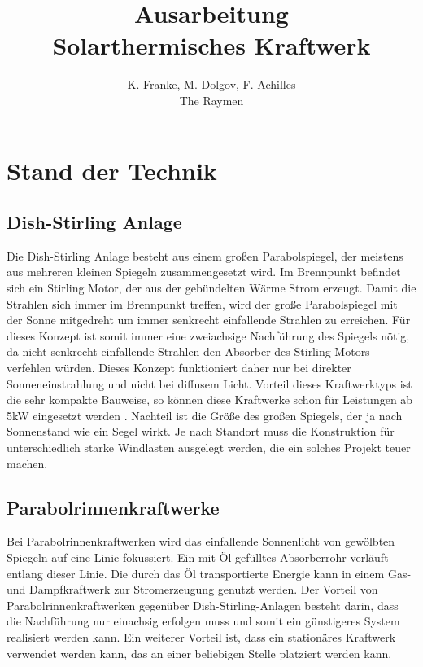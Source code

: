 \documentclass[fontsize=10pt,paper=a4,bibliography=totoc]{scrartcl}
\title{Ausarbeitung\\Solarthermisches Kraftwerk}
\author{K. Franke, M. Dolgov, F. Achilles\\The Raymen}
\begin{document}
\maketitle

\section{Stand der Technik}

\subsection{Dish-Stirling Anlage}
Die Dish-Stirling Anlage besteht aus einem großen Parabolspiegel, der meistens aus mehreren kleinen Spiegeln zusammengesetzt wird. Im Brennpunkt befindet sich ein Stirling Motor, der aus der gebündelten Wärme Strom erzeugt. Damit die Strahlen sich immer im Brennpunkt treffen, wird der große Parabolspiegel mit der Sonne mitgedreht um immer senkrecht einfallende Strahlen zu erreichen. Für dieses Konzept ist somit immer eine zweiachsige Nachführung des Spiegels nötig, da nicht senkrecht einfallende Strahlen den Absorber des Stirling Motors verfehlen würden. Dieses Konzept funktioniert daher nur bei direkter Sonneneinstrahlung und nicht bei diffusem Licht. Vorteil dieses Kraftwerktyps ist die sehr kompakte Bauweise, so können diese Kraftwerke schon für Leistungen ab 5kW eingesetzt werden \cite{1}. Nachteil ist die Größe des großen Spiegels, der ja nach Sonnenstand wie ein Segel wirkt. Je nach Standort muss die Konstruktion für unterschiedlich starke Windlasten ausgelegt werden, die ein solches Projekt teuer machen.
 
\subsection{Parabolrinnenkraftwerke}
Bei Parabolrinnenkraftwerken wird das einfallende Sonnenlicht von gewölbten Spiegeln auf eine Linie fokussiert. Ein mit Öl gefülltes Absorberrohr verläuft entlang dieser Linie. Die durch das Öl transportierte Energie kann in einem Gas- und Dampfkraftwerk zur Stromerzeugung genutzt werden. Der Vorteil von Parabolrinnenkraftwerken gegenüber Dish-Stirling-Anlagen besteht darin, dass die Nachführung nur einachsig erfolgen muss und somit ein günstigeres System realisiert werden kann. Ein weiterer Vorteil ist, dass ein stationäres Kraftwerk verwendet werden kann, das an einer beliebigen Stelle platziert werden kann. 
\end{document}
